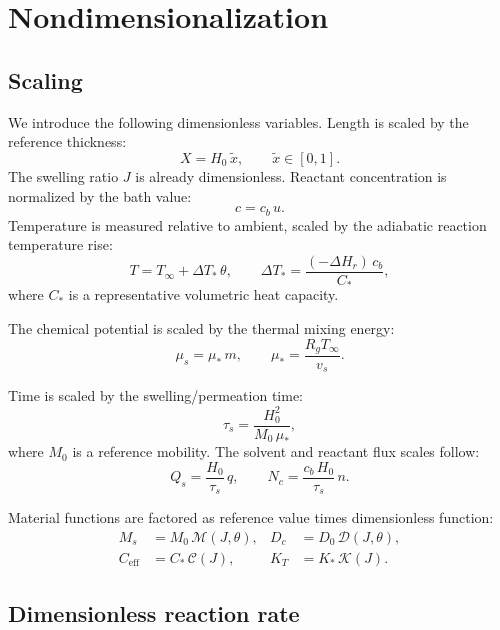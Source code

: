 \documentclass[aps,pre,reprint,superscriptaddress,longbibliography,floatfix]{revtex4-2}
\newcommand{\Ms}{\mathcal{M}}
\newcommand{\Ds}{\mathcal{D}}
\newcommand{\Cs}{\mathcal{C}}
\newcommand{\Ks}{\mathcal{K}}
\begin{document}
\section{Nondimensionalization}
\label{app:nondim}

\subsection{Scaling}

We introduce the following dimensionless variables. Length is scaled by the reference thickness:
\begin{equation}
  X = H_0\,\tilde{x}, \qquad \tilde{x}\in[0,1].
\end{equation}
The swelling ratio $J$ is already dimensionless. Reactant concentration is normalized by the bath value:
\begin{equation}
  c = c_b\,u.
\end{equation}
Temperature is measured relative to ambient, scaled by the adiabatic reaction temperature rise:
\begin{equation}
  T = T_\infty + \Delta T_*\,\theta,
  \qquad
  \Delta T_* = \frac{(-\Delta H_r)\,c_b}{C_*},
\end{equation}
where $C_*$ is a representative volumetric heat capacity.

The chemical potential is scaled by the thermal mixing energy:
\begin{equation}
  \mu_s = \mu_*\,m, \qquad \mu_* = \frac{R_g T_\infty}{v_s}.
\end{equation}

Time is scaled by the swelling/permeation time:
\begin{equation}
  \tau_s = \frac{H_0^2}{M_0\,\mu_*},
\end{equation}
where $M_0$ is a reference mobility. The solvent and reactant flux scales follow:
\begin{equation}
  Q_s = \frac{H_0}{\tau_s}\,q,
  \qquad
  N_c = \frac{c_b\,H_0}{\tau_s}\,n.
\end{equation}

Material functions are factored as reference value times dimensionless function:
\begin{align}
  M_s &= M_0\,\Ms(J,\theta), &
  D_c &= D_0\,\Ds(J,\theta), \\
  C_\mathrm{eff} &= C_*\,\Cs(J), &
  K_T &= K_*\,\Ks(J).
\end{align}

\subsection{Dimensionless reaction rate}
\end{document}
